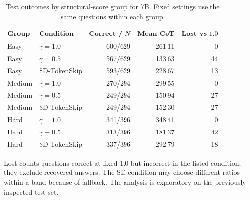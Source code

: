 \begin{table}[H]\centering\small

\caption{Test outcomes by structural-score group for 7B. Fixed settings use the same questions within each group.}

\begin{tabular}{llrrr}

\toprule

Group & Condition & Correct / $N$ & Mean CoT & Lost vs $1.0$\\

\midrule

Easy & $\gamma=1.0$ & 600/629 & 261.11 & 0\\

Easy & $\gamma=0.5$ & 567/629 & 133.63 & 44\\

Easy & SD-TokenSkip & 593/629 & 228.67 & 13\\

Medium & $\gamma=1.0$ & 270/294 & 299.55 & 0\\

Medium & $\gamma=0.5$ & 249/294 & 150.94 & 27\\

Medium & SD-TokenSkip & 249/294 & 152.30 & 27\\

Hard & $\gamma=1.0$ & 341/396 & 348.41 & 0\\

Hard & $\gamma=0.5$ & 313/396 & 181.37 & 42\\

Hard & SD-TokenSkip & 337/396 & 292.79 & 18\\

\bottomrule\end{tabular}\end{table}

Lost counts questions correct at fixed 1.0 but incorrect in the listed condition; they exclude recovered answers. The SD condition may choose different ratios within a band because of fallback. The analysis is exploratory on the previously inspected test set.
